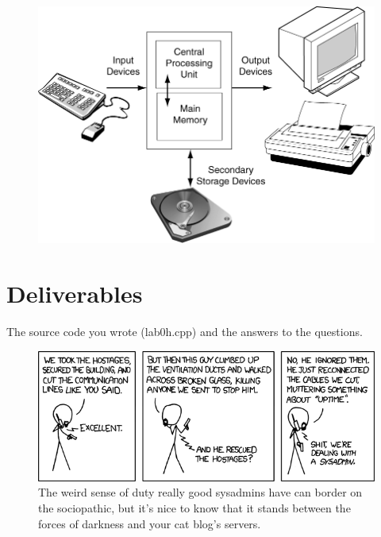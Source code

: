 \documentclass[letterpaper,12pt]{article}
\begin{document}
\begin{figure}[h!]
    \centering
    \includegraphics[width=5in]{graphic_no_answers.png}
\end{figure}

\section*{Deliverables}
The source code you wrote (lab0h.cpp) and the answers to the questions.

\begin{figure}[ht!]
	\centering
	\includegraphics[width=5in]{devotion_to_duty.png}
	\caption*{The weird sense of duty really good sysadmins have can border on the sociopathic, 
		but it's nice to know that it stands between the forces of darkness and your cat blog's servers.}
\end{figure}
\end{document}
